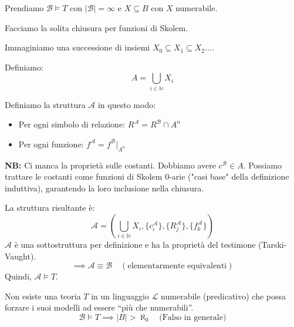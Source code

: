 \documentclass[a4paper,11pt]{report}
\begin{document}
\begin{proofframe}[title=idea di dimostrazione]
Prendiamo \(\mathcal{B} \models T\) con \(|\mathcal{B}| = \infty\) e \(X \subseteq B\) con \(X\) numerabile.

Facciamo la solita chiusura per funzioni di Skolem. 

Immaginiamo una successione di insiemi \(X_0 \subseteq  X_1 \subseteq X_2 \dots\).

Definiamo:
\[
A = \bigcup_{i \in \mathbb{N}} X_i
\]

Definiamo la struttura \(\mathcal{A}\) in questo modo:
\begin{itemize}
    \item Per ogni simbolo di relazione: \(R^\mathcal{A} = R^\mathcal{B} \cap A^n\)
    \item Per ogni funzione: \(f^\mathcal{A} = f^\mathcal{B} \big|_{A^n}\)
\end{itemize}

\textbf{NB:} Ci manca la proprietà sulle costanti. Dobbiamo avere \(c^\mathcal{B} \in A\). Possiamo trattare le costanti come funzioni di Skolem 0-arie {\color{gray} \small("casi base" della definizione induttiva)}, garantendo la loro inclusione nella chiusura.

La struttura risultante è:
\[
\mathcal{A} = \left( \bigcup_{i \in \mathbb{N}} X_i, \{c_i^\mathcal{A}\}, \{R_j^\mathcal{A}\}, \{f_k^\mathcal{A}\} \right)
\]
\(\mathcal{A}\) è una sottostruttura per definizione e ha la proprietà del testimone (Tarski-Vaught).
\[
\implies \mathcal{A} \equiv \mathcal{B} \quad (\text{elementarmente equivalenti})
\]
Quindi, \(\mathcal{A} \models T\).
\end{proofframe}


\begin{corframe}{}{}
Non esiste una teoria \(T\) in un linguaggio \(\mathcal{L}\) numerabile (predicativo) che possa forzare i suoi modelli ad essere ``più che numerabili''.
\[
\mathcal{B} \models T \implies |B| > \aleph_0 \quad \text{(Falso in generale)}
\]
\end{corframe}
\end{document}
